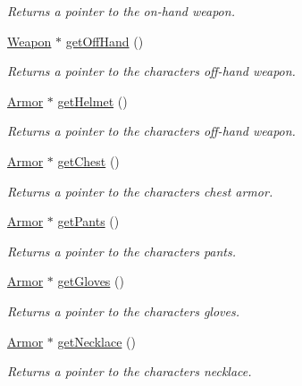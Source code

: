 \begin{DoxyCompactItemize}
\begin{DoxyCompactList}\small\item\em Returns a pointer to the on-\/hand weapon. \end{DoxyCompactList}\item 
\mbox{\hyperlink{class_weapon}{Weapon}} $\ast$ \mbox{\hyperlink{class_character_a3e789de343597dfdf68b4aa45d537878}{get\+Off\+Hand}} ()
\begin{DoxyCompactList}\small\item\em Returns a pointer to the character\textquotesingle{}s off-\/hand weapon. \end{DoxyCompactList}\item 
\mbox{\hyperlink{class_armor}{Armor}} $\ast$ \mbox{\hyperlink{class_character_a4e4cb7d3a8fb615db8f4a8c6543c447f}{get\+Helmet}} ()
\begin{DoxyCompactList}\small\item\em Returns a pointer to the character\textquotesingle{}s off-\/hand weapon. \end{DoxyCompactList}\item 
\mbox{\hyperlink{class_armor}{Armor}} $\ast$ \mbox{\hyperlink{class_character_a5bdf09759593911af55ce0a9f9f7959f}{get\+Chest}} ()
\begin{DoxyCompactList}\small\item\em Returns a pointer to the character\textquotesingle{}s chest armor. \end{DoxyCompactList}\item 
\mbox{\hyperlink{class_armor}{Armor}} $\ast$ \mbox{\hyperlink{class_character_a201f089787a3b1b1b6c8aa15677f5eb0}{get\+Pants}} ()
\begin{DoxyCompactList}\small\item\em Returns a pointer to the character\textquotesingle{}s pants. \end{DoxyCompactList}\item 
\mbox{\hyperlink{class_armor}{Armor}} $\ast$ \mbox{\hyperlink{class_character_ab16921d24cd1846676b6774c2de50c67}{get\+Gloves}} ()
\begin{DoxyCompactList}\small\item\em Returns a pointer to the character\textquotesingle{}s gloves. \end{DoxyCompactList}\item 
\mbox{\hyperlink{class_armor}{Armor}} $\ast$ \mbox{\hyperlink{class_character_a8e5929a6b0405a011b2055a25e7ef41f}{get\+Necklace}} ()
\begin{DoxyCompactList}\small\item\em Returns a pointer to the character\textquotesingle{}s necklace. \end{DoxyCompactList}\item 

\end{DoxyCompactItemize}
